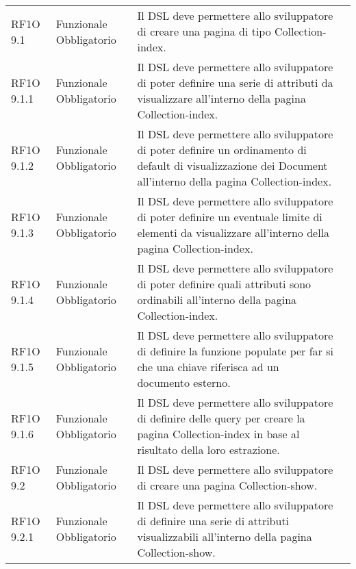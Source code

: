 \begin{center}
\begin{longtable}{ | p{2cm} | p{2cm} | p{5cm} | p{2cm} |}
 &  \\ \hline      
        RF1O 9.1  & Funzionale \newline  Obbligatorio  & Il DSL deve permettere allo sviluppatore di creare una pagina di tipo Collection-index.
 &  \\ \hline      
        RF1O 9.1.1  & Funzionale \newline  Obbligatorio  & Il DSL deve permettere allo sviluppatore di poter definire una serie di attributi da visualizzare all'interno della pagina Collection-index.
 &  \\ \hline      
        RF1O 9.1.2  & Funzionale \newline  Obbligatorio  & Il DSL deve permettere allo sviluppatore di poter definire un ordinamento di default di visualizzazione dei Document all'interno della pagina Collection-index. &  \\ \hline      
        RF1O 9.1.3  & Funzionale \newline  Obbligatorio  & Il DSL deve permettere allo sviluppatore di poter definire un eventuale limite di elementi da visualizzare all'interno della pagina Collection-index.
 &  \\ \hline      
        RF1O 9.1.4  & Funzionale \newline  Obbligatorio  & Il DSL deve permettere allo sviluppatore di poter definire quali attributi sono ordinabili all'interno della pagina Collection-index.
 &  \\ \hline      
        RF1O 9.1.5 & Funzionale \newline  Obbligatorio  & Il DSL deve permettere allo sviluppatore di definire la funzione populate per far si che una chiave riferisca ad un documento esterno.
 &  \\ \hline      
        RF1O 9.1.6 & Funzionale \newline  Obbligatorio  & Il DSL deve permettere allo sviluppatore di definire delle query per creare la pagina Collection-index in base al risultato della loro estrazione.
 &  \\ \hline      
        RF1O 9.2 & Funzionale \newline  Obbligatorio  & Il DSL deve permettere allo sviluppatore di creare una pagina Collection-show. &  \\ \hline      
        RF1O 9.2.1  & Funzionale \newline  Obbligatorio  & Il DSL deve permettere allo sviluppatore di definire una serie di attributi visualizzabili all'interno della pagina Collection-show.
 &  \\ \hline      

\end{longtable}
\end{center}
